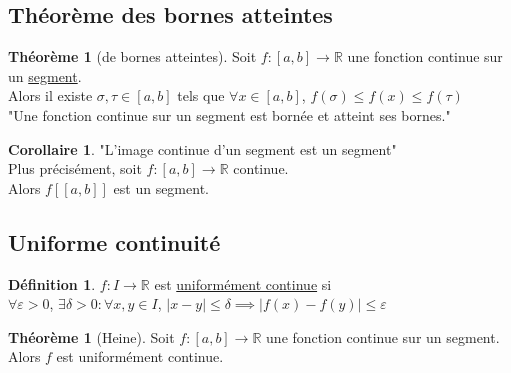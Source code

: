 \documentclass[10pt,a4paper]{article}
\theoremstyle{definition}
\newtheorem{theorem}[proposition]{Théorème}
\newtheorem{corollaire}[proposition]{Corollaire}
\newtheorem{definition}[proposition]{Définition}
\begin{document}
\subsection{Théorème des bornes atteintes}
\begin{theorem}[de bornes atteintes]
Soit $f: [a, b] \to \mathbb{R}$ une fonction continue sur un \uline{segment}. \\
Alors il existe $\sigma, \tau \in [a, b]$ tels que $\forall x \in [a, b]$, $f(\sigma) \leq f(x) \leq f(\tau)$ \\
"Une fonction continue sur un segment est bornée et atteint ses bornes."
\end{theorem}
\begin{corollaire}
"L'image continue d'un segment est un segment" \\
Plus précisément, soit $f: [a, b] \to \mathbb{R}$ continue. \\
Alors $f[[a, b]]$ est un segment.
\end{corollaire}

\subsection{Uniforme continuité}
\begin{definition}
$f: I \to \mathbb{R}$ est \uline{uniformément continue} si \\
$\forall \varepsilon > 0$, $\exists \delta > 0 : \forall x, y \in I$, $|x - y| \leq \delta \implies |f(x) - f(y)| \leq \varepsilon$
\end{definition}
\begin{theorem}[Heine]
Soit $f: [a, b] \to \mathbb{R}$ une fonction continue sur un segment. \\
Alors $f$ est uniformément continue.
\end{theorem}
\end{document}
